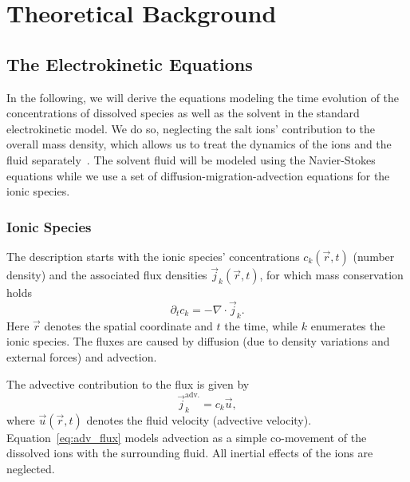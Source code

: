 \section{\label{sec:theory}Theoretical Background}

\subsection{The Electrokinetic Equations}

In the following, we will derive the equations modeling the time evolution of the concentrations of dissolved species as well as the solvent in the standard electrokinetic model. We do so, neglecting the salt ions' contribution to the overall mass density, which allows us to treat the dynamics of the ions and the fluid separately~\cite{degraaf14a}. The solvent fluid will be modeled using the Navier-Stokes equations while we use a set of diffusion-migration-advection equations for the ionic species.

\subsubsection{\label{sub:species}Ionic Species}

The description starts with the ionic species' concentrations $c_{k}(\vec{r}, t)$ (number density) and the associated flux densities $\vec{j}_{k}(\vec{r}, t)$, for which mass conservation holds
%
\begin{equation}
\label{eq:model_continuity}
\partial_{t} c_{k} = -\nabla \cdot\vec{j}_{k} . 
\end{equation}
%
Here $\vec{r}$ denotes the spatial coordinate and $t$ the time, while $k$ enumerates the ionic species. The fluxes are caused by diffusion (due to density variations and external forces) and advection.

The advective contribution to the flux is given by
%
\begin{equation}
\label{eq:adv_flux}
\vec{j}_{k}^{\mathrm{adv.}} = c_{k} \vec{u} ,
\end{equation}
%
where $\vec{u}(\vec{r}, t)$ denotes the fluid velocity (advective velocity). Equation~\eqref{eq:adv_flux} models advection as a simple co-movement of the dissolved ions with the surrounding fluid. All inertial effects of the ions are neglected.

